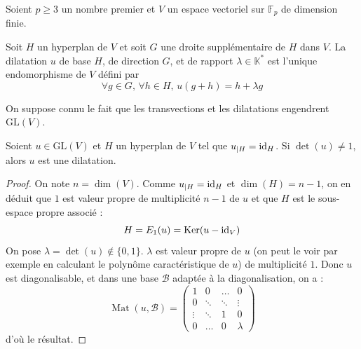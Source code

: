 





  Soient $p \geq 3$ un nombre premier et $V$ un espace vectoriel sur $\mathbb{F}_p$ de dimension finie.


  \begin{definition}
    Soit $H$ un hyperplan de $V$ et soit $G$ une droite supplémentaire de $H$ dans $V$.
    La dilatation $u$ de base $H$, de direction $G$, et de rapport $\lambda \in \mathbb{K}^*$ est l'unique endomorphisme de $V$ défini par
    \[ \forall g \in G, \, \forall h \in H, \, u(g+h) = h + \lambda g \]
  \end{definition}


  \begin{remark}
    \label{theoreme-de-frobenius-zolotarev-1}
    On suppose connu le fait que les transvections et les dilatations engendrent $\mathrm{GL}(V)$.
  \end{remark}


  \begin{lemma}
    \label{theoreme-de-frobenius-zolotarev-2}
    Soient $u \in \mathrm{GL}(V)$ et $H$ un hyperplan de $V$ tel que $u_{|H} = \operatorname{id}_H$. Si $\det(u) \neq 1$, alors $u$ est une dilatation.
  \end{lemma}

  \begin{proof}
    On note $n = \dim(V)$. Comme $u_{|H} = \operatorname{id}_H$ et $\dim(H) = n-1$, on en déduit que $1$ est valeur propre de multiplicité $n-1$ de $u$ et que $H$ est le sous-espace propre associé :
    \[ H = E_1(u) = \mathrm{Ker}(u - \operatorname{id}_V) \]
    On pose $\lambda = \det(u) \notin \{ 0, 1 \}$. $\lambda$ est valeur propre de $u$ (on peut le voir par exemple en calculant le polynôme caractéristique de $u$) de multiplicité $1$. Donc $u$ est diagonalisable, et dans une base $\mathcal{B}$ adaptée à la diagonalisation, on a :
    \[ \operatorname{Mat}(u, \mathcal{B}) =
    \begin{pmatrix}
      1 & 0 & \dots & 0 \\
      0 & \ddots & \ddots & \vdots \\
      \vdots & \ddots & 1 & 0 \\
      0 & \dots & 0 & \lambda
    \end{pmatrix}
    \]
    d'où le résultat.
  \end{proof}

